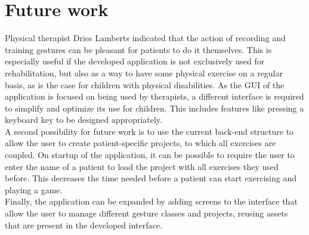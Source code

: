 \section{Future work}

Physical therapist Dries Lamberts indicated that the action of recording and training gestures can be pleasant for patients to do it themselves. This is especially useful if the developed application is not exclusively used for rehabilitation, but also as a way to have some physical exercise on a regular basis, as is the case for children with physical disabilities. As the GUI of the application is focused on being used by therapists, a different interface is required to simplify and optimize its use for children. This includes features like pressing a keyboard key to be designed appropriately.\\

A second possibility for future work is to use the current back-end structure to allow the user to create patient-specific projects, to which all exercises are coupled. On startup of the application, it can be possible to require the user to enter the name of a patient to load the project with all exercises they used before. This decreases the time needed before a patient can start exercising and playing a game.\\

Finally, the application can be expanded by adding screens to the interface that allow the user to manage different gesture classes and projects, reusing assets that are present in the developed interface.
